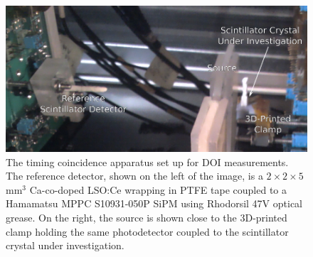 \begin{figure}[h!]
\begin{center}
\includegraphics[width=0.7\columnwidth]{./figures/actualsetup/actualsetup.png}
\caption{\label{fig:actualsetup} The timing coincidence apparatus set up for DOI measurements. The reference detector, shown on the left of the image, is a $2\times2\times5$mm$^3$ Ca-co-doped LSO:Ce wrapping in PTFE tape coupled to a Hamamatsu MPPC S10931-050P SiPM using Rhodorsil 47V optical grease. On the right, the source is shown close to the 3D-printed clamp holding the same photodetector coupled to the scintillator crystal under investigation.}
\end{center}
\end{figure}
